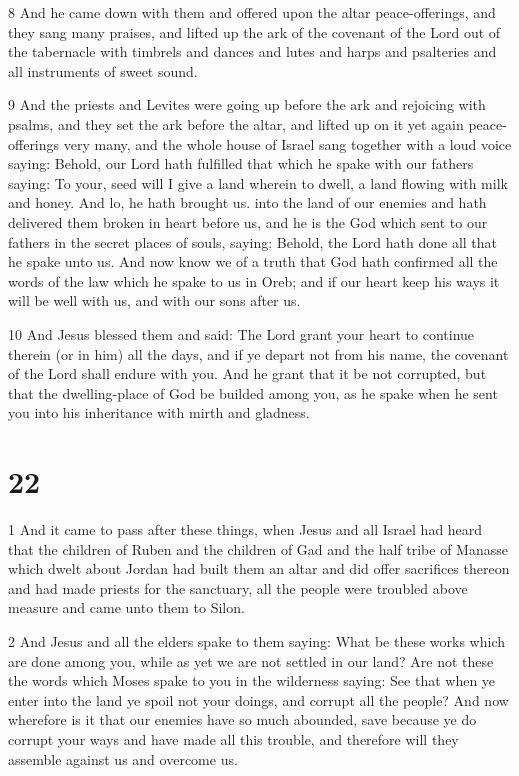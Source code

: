 \par 8 And he came down with them and offered upon the altar peace-offerings, and they sang many praises, and lifted up the ark of the covenant of the Lord out of the tabernacle with timbrels and dances and lutes and harps and psalteries and all instruments of sweet sound. 

\par 9 And the priests and Levites were going up before the ark and rejoicing with psalms, and they set the ark before the altar, and lifted up on it yet again peace-offerings very many, and the whole house of Israel sang together with a loud voice saying: Behold, our Lord hath fulfilled that which he spake with our fathers saying: To your, seed will I give a land wherein to dwell, a land flowing with milk and honey. And lo, he hath brought us. into the land of our enemies and hath delivered them broken in heart before us, and he is the God which sent to our fathers in the secret places of souls, saying: Behold, the Lord hath done all that he spake unto us. And now know we of a truth that God hath confirmed all the words of the law which he spake to us in Oreb; and if our heart keep his ways it will be well with us, and with our sons after us. 

\par 10 And Jesus blessed them and said: The Lord grant your heart to continue therein (or in him) all the days, and if ye depart not from his name, the covenant of the Lord shall endure with you. And he grant that it be not corrupted, but that the dwelling-place of God be builded among you, as he spake when he sent you into his inheritance with mirth and gladness.



\chapter{22}

\par 1 And it came to pass after these things, when Jesus and all Israel had heard that the children of Ruben and the children of Gad and the half tribe of Manasse which dwelt about Jordan had built them an altar and did offer sacrifices thereon and had made priests for the sanctuary, all the people were troubled above measure and came unto them to Silon. 

\par 2 And Jesus and all the elders spake to them saying: What be these works which are done among you, while as yet we are not settled in our land? Are not these the words which Moses spake to you in the wilderness saying: See that when ye enter into the land ye spoil not your doings, and corrupt all the people? And now wherefore is it that our enemies have so much abounded, save because ye do corrupt your ways and have made all this trouble, and therefore will they assemble against us and overcome us.

